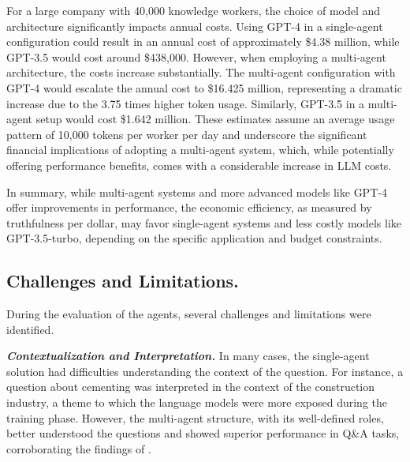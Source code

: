             For a large company with 40,000 knowledge workers, the choice of model and architecture significantly impacts annual costs. Using GPT-4 in a single-agent configuration could result in an annual cost of approximately \$4.38 million, while GPT-3.5 would cost around \$438,000. However, when employing a multi-agent architecture, the costs increase substantially. The multi-agent configuration with GPT-4 would escalate the annual cost to \$16.425 million, representing a dramatic increase due to the 3.75 times higher token usage. Similarly, GPT-3.5 in a multi-agent setup would cost \$1.642 million. These estimates assume an average usage pattern of 10,000 tokens per worker per day and underscore the significant financial implications of adopting a multi-agent system, which, while potentially offering performance benefits, comes with a considerable increase in LLM costs.

            In summary, while multi-agent systems and more advanced models like GPT-4 offer improvements in performance, the economic efficiency, as measured by truthfulness per dollar, may favor single-agent systems and less costly models like GPT-3.5-turbo, depending on the specific application and budget constraints.
            
        
        \subsection{Challenges and Limitations.}     
            During the evaluation of the agents, several challenges and limitations were identified.

            \setlength{\parindent}{1em}
            \textbf{\textit{Contextualization and Interpretation.}} 
                In many cases, the single-agent solution had difficulties understanding the context of the question. For instance, a question about cementing was interpreted in the context of the construction industry, a theme to which the language models were more exposed during the training phase. However, the multi-agent structure, with its well-defined roles, better understood the questions and showed superior performance in Q\&A tasks, corroborating the findings of \cite{Li2024}.
            
